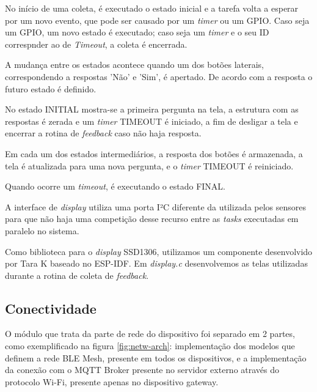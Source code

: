 \documentclass[../monografia.tex]{subfiles}
\begin{document}
No início de uma coleta, é executado o estado inicial e a tarefa volta a esperar por um novo evento, que pode ser causado por um \textit{timer} ou um GPIO. Caso seja um GPIO, um novo estado é executado; caso seja um \textit{timer} e o seu ID correspnder ao de \textit{Timeout}, a coleta é encerrada.

A mudança entre os estados acontece quando um dos botões laterais, correspondendo a respostas 'Não' e 'Sim', é apertado. De acordo com a resposta o futuro estado é definido. 

No estado INITIAL mostra-se a primeira pergunta na tela, a estrutura com as respostas é zerada e um \textit{timer} TIMEOUT é iniciado, a fim de desligar a tela e encerrar a rotina de \textit{feedback} caso não haja resposta. 

Em cada um dos estados intermediários, a resposta dos botões é armazenada, a tela é atualizada para uma nova pergunta, e o \textit{timer} TIMEOUT é reiniciado. 

Quando ocorre um \textit{timeout}, é executando o estado FINAL. 

A interface de \textit{display} utiliza uma porta I²C diferente da utilizada pelos sensores para que não haja uma competição desse recurso entre as \textit{tasks} executadas em paralelo no sistema.

Como biblioteca para o \textit{display} SSD1306, utilizamos um componente desenvolvido por Tara K \cite{TaraK} baseado no ESP-IDF\cite{SSD1306}. Em \textit{display.c} desenvolvemos as telas utilizadas durante a rotina de coleta de \textit{feedback}. 


\subsection{Conectividade}

O módulo que trata da parte de rede do dispositivo foi separado em 2 partes, como exemplificado na figura \ref{fig:netw-arch}: implementação dos modelos que definem a rede BLE Mesh, presente em todos os dispositivos, e a implementação da conexão com o MQTT Broker presente no servidor externo através do protocolo Wi-Fi, presente apenas no dispositivo gateway.
\end{document}
